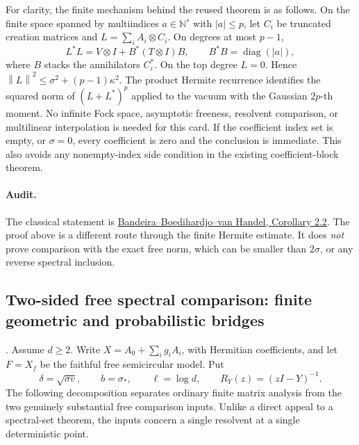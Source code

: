 \documentclass[11pt,a4paper]{article}
\newcommand{\N}{\mathbb N}
\newcommand{\norm}[1]{\left\lVert#1\right\rVert}
\DeclareRobustCommand{\code}[1]{{\footnotesize\urlstyle{tt}\nolinkurl{#1}}}
\begin{document}
For clarity, the finite mechanism behind the reused theorem is as follows.
On the finite space spanned by multiindices \(a\in\N^s\) with \(|a|\leq p\),
let \(C_i\) be truncated creation matrices and
\(L=\sum_i A_i\otimes C_i\).  On degrees at most \(p-1\),
\[
 L^*L=V\otimes I+B^*(T\otimes I)B,
 \qquad B^*B=\operatorname{diag}(|a|),
\]
where \(B\) stacks the annihilators \(C_i^*\).  On the top degree \(L=0\).
Hence \(\norm L^2\leq\sigma^2+(p-1)\kappa^2\).
The product Hermite recurrence identifies the squared norm of
\((L+L^*)^p\) applied to the vacuum with the Gaussian \(2p\)-th moment.
No infinite Fock space, asymptotic freeness, resolvent comparison, or
multilinear interpolation is needed for this card.
If the coefficient index set is empty, or \(\sigma=0\), every coefficient is
zero and the conclusion is immediate.  This also avoids any nonempty-index
side condition in the existing coefficient-block theorem.

\paragraph{Audit.}
The classical statement is
\href{https://arxiv.org/abs/2108.06312v2}{Bandeira--Boedihardjo--van Handel,
Corollary 2.2}.  The proof above is a different route through the finite
Hermite estimate.  It does \emph{not} prove comparison with the exact free
norm, which can be smaller than \(2\sigma\), or any reverse spectral inclusion.

\subsection{Two-sided free spectral comparison: finite geometric and probabilistic bridges}
\label{route:gaussian-free-spectrum-two-sided}
\noindent\code{gaussian-free-spectrum-two-sided}.
Assume \(d\geq2\). Write \(X=A_0+\sum_i g_iA_i\), with Hermitian coefficients, and let \(F=X_f\)
be the faithful free semicircular model.  Put
\[
 \delta=\sqrt{\sigma v},\qquad
 b=\sigma_*,\qquad \ell=\log d,
 \qquad R_Y(z)=(zI-Y)^{-1}.
\]
The following decomposition separates ordinary finite matrix analysis from
the two genuinely substantial free comparison inputs.  Unlike a direct
appeal to a spectral-set theorem, the inputs concern a single resolvent at
a single deterministic point.
\end{document}
